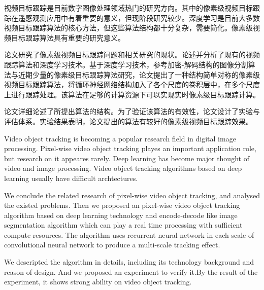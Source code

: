 
\begin{cabstract}
	视频目标跟踪是目前数字图像处理领域热门的研究方向。其中的像素级视频目标跟踪在遥感观测应用中有着重要的意义，但现阶段研究较少。深度学习是目前大多数视频目标跟踪算法的核心方法，但这些算法结构都十分复杂，需要简化。像素级视频目标跟踪算法具有重要的研究意义。
	\par
	论文研究了像素级视频目标跟踪问题和相关研究的现状。论述并分析了现有的视频跟踪算法和深度学习技术。基于深度学习技术，参考加密-解码结构的图像分割算法与近期少量的像素级目标跟踪算法研究，论文提出了一种结构简单对称的像素级视频目标跟踪算法，将循环神经网络结构加入了各个尺度的卷积层中，在多个尺度上进行跟踪处理。该算法在足够的计算资源下可以实现实时像素级目标跟踪计算。
	\par
	论文详细论述了所提出算法的结构。为了验证该算法的有效性，论文设计了实验与评估体系。实验结果表明，论文提出的算法有较好的像素级视频目标跟踪效果。
\end{cabstract}

\begin{eabstract} %
	Video object tracking is becoming a popular research field in digital image processing. Pixel-wise video object tracking playes an important application role, but research on it appeares rarely. Deep learning has become major thought of video and image processing. Video object tracking algorithms based on deep learning usually have difficult archtectures. 
	\par
	We conclude the related research of pixel-wise video object tracking, and analysed the existed problems. Then we proposed an pixel-wise video object tracking algorithm based on deep learning technology and encode-decode like image segmentation algorithm which can play a real time processing with sufficient compute resources. The algorithm uses recurrent neural network in each scale of convolutional neural network to produce a multi-scale tracking effect.
	\par
	We descripted the algorithm in details, including its technology background and reason of design. And we proposed an experiment to verify it.By the result of the experiment, it shows strong ability on video object tracking.
\end{eabstract}

